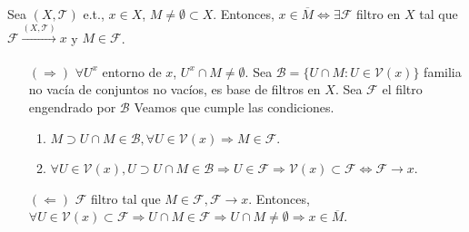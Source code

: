 \begin{prop}
  Sea $( X, \mathcal{T} )$ e.t., $x \in X$, $M \neq \emptyset \subset X$. Entonces, $x \in \overline{M} \Leftrightarrow \exists \mathcal{F}$ filtro en $X$ tal que $\mathcal{F} \xrightarrow[]{ ( X, \mathcal{T} ) } x$ y $M \in \mathcal{F}$. 
\end{prop}

\begin{dem}
  \begin{enumerate}[label=(\roman*)]
    \item []
    \item [$(\Rightarrow)$] $\forall U^{x}$ entorno de $x$, $U^{x} \cap M \neq \emptyset$. Sea $\mathcal{B} = \{ U \cap M : U \in \mathcal{V}(x) \}$ familia no vacía de conjuntos no vacíos, es base de filtros en $X$. Sea $\mathcal{F}$ el filtro engendrado por $\mathcal{B}$ Veamos que cumple las condiciones.
      \begin{enumerate}[label=(\roman*)]
        \item $M \supset U \cap M \in \mathcal{B}, \forall U \in \mathcal{V}(x) \Rightarrow M \in \mathcal{F}$.
        \item $\forall U \in \mathcal{V}(x), U \supset U \cap M \in \mathcal{B} \Rightarrow U \in \mathcal{F} \Rightarrow \mathcal{V}(x) \subset \mathcal{F} \Leftrightarrow \mathcal{F} \rightarrow x$.
      \end{enumerate}
    \item [$(\Leftarrow)$] $\mathcal{F}$ filtro tal que $M \in \mathcal{F}, \mathcal{F} \rightarrow x$. Entonces, $\forall U \in \mathcal{V}(x) \subset \mathcal{F} \Rightarrow U \cap M \in \mathcal{F} \Rightarrow U \cap M \neq \emptyset \Rightarrow x \in \overline{M}$.
  \end{enumerate}
\end{dem}
